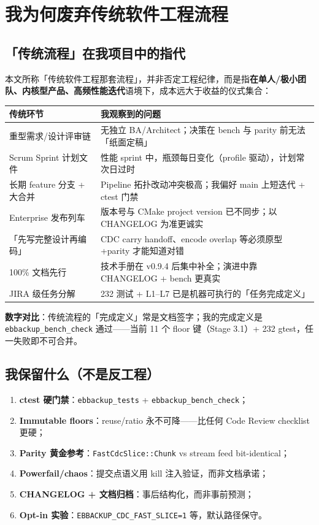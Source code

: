 \chapter{我为何废弃传统软件工程流程}
\label{ch:abandoned}

\section{「传统流程」在我项目中的指代}

本文所称「传统软件工程那套流程」，并非否定工程纪律，而是指\textbf{在单人/极小团队、内核型产品、高频性能迭代}语境下，成本远大于收益的仪式集合：

\begin{longtable}{@{}lp{9cm}@{}}
\toprule
传统环节 & 我观察到的问题 \\
\midrule
重型需求/设计评审链 & 无独立 BA/Architect；决策在 bench 与 parity 前无法「纸面定稿」 \\
Scrum Sprint 计划文件 & 性能 sprint 中，瓶颈每日变化（profile 驱动），计划常次日过时 \\
长期 feature 分支 + 大合并 & Pipeline 拓扑改动冲突极高；我偏好 main 上短迭代 + ctest 门禁 \\
Enterprise 发布列车 & 版本号与 CMake project version 已不同步；以 CHANGELOG 为准更诚实 \\
「先写完整设计再编码」 & CDC carry handoff、encode overlap 等必须原型+parity 才能知道对错 \\
100\% 文档先行 & 技术手册在 v0.9.4 后集中补全；演进中靠 CHANGELOG + bench 更真实 \\
JIRA 级任务分解 & 232 测试 + L1--L7 已是机器可执行的「任务完成定义」 \\
\bottomrule
\end{longtable}

\textbf{数字对比}：传统流程的「完成定义」常是文档签字；我的完成定义是 \texttt{ebbackup\_bench\_check} 通过——当前 11 个 floor 键（Stage 3.1）+ 232 gtest，任一失败即不可合并。

\section{我保留什么（不是反工程）}

\begin{philobox}
\begin{enumerate}[nosep]
  \item \textbf{ctest 硬门禁}：\texttt{ebbackup\_tests} + \texttt{ebbackup\_bench\_check}；
  \item \textbf{Immutable floors}：reuse/ratio 永不可降——比任何 Code Review checklist 更硬；
  \item \textbf{Parity 黄金参考}：\texttt{FastCdcSlice::Chunk} vs stream feed bit-identical；
  \item \textbf{Powerfail/chaos}：提交点语义用 kill 注入验证，而非文档承诺；
  \item \textbf{CHANGELOG + 文档归档}：事后结构化，而非事前预测；
  \item \textbf{Opt-in 实验}：\texttt{EBBACKUP\_CDC\_FAST\_SLICE=1} 等，默认路径保守。
\end{enumerate}
\end{philobox}

